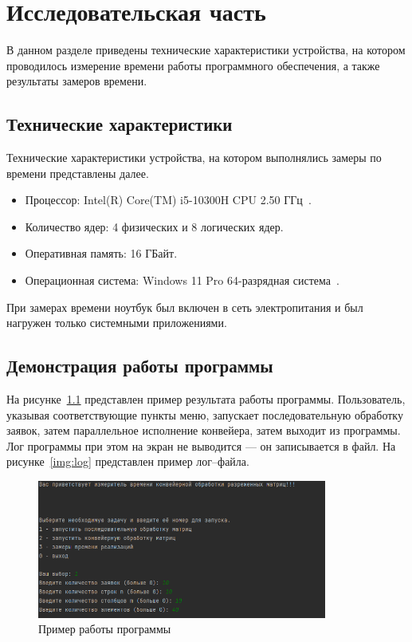 \chapter{Исследовательская часть}

В данном разделе приведены технические характеристики устройства, на котором проводилось измерение времени работы программного обеспечения, а также результаты замеров времени.

\section{Технические характеристики}

Технические характеристики устройства, на котором выполнялись замеры по времени представлены далее.

\begin{itemize}[label=---]
	\item Процессор: Intel(R) Core(TM) i5-10300H CPU 2.50 ГГц~\cite{intel}.
	\item Количество ядер: 4 физических и 8 логических ядер.
	\item Оперативная память: 16 ГБайт.
	\item Операционная система: Windows 11 Pro 64-разрядная система~\cite{windows}.
\end{itemize}

При замерах времени ноутбук был включен в сеть электропитания и был нагружен только системными приложениями.

\section{Демонстрация работы программы}

На рисунке~\ref{img:example} представлен пример результата работы программы. 
Пользователь, указывая соответствующие пункты меню, запускает последовательную обработку заявок, затем параллельное исполнение конвейера, затем выходит из программы. Лог программы при этом на экран не выводится — он записывается в файл. 
На рисунке~\ref{img:log} представлен пример лог–файла.

\begin{figure}[h]
	\centering
	\includegraphics[width=0.85\textwidth]{img/example.png}
	\caption{Пример работы программы}
	\label{img:example}
\end{figure}

